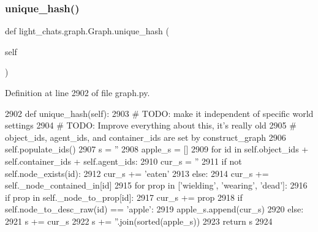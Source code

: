 \subsubsection{\texorpdfstring{unique\+\_\+hash()}{unique\_hash()}}
{\footnotesize\ttfamily def light\+\_\+chats.\+graph.\+Graph.\+unique\+\_\+hash (\begin{DoxyParamCaption}\item[{}]{self }\end{DoxyParamCaption})}



Definition at line 2902 of file graph.\+py.


\begin{DoxyCode}
2902     \textcolor{keyword}{def }unique\_hash(self):
2903         \textcolor{comment}{# TODO: make it independent of specific world settings}
2904         \textcolor{comment}{# TODO: Improve everything about this, it's really old}
2905         \textcolor{comment}{# object\_ids, agent\_ids, and container\_ids are set by construct\_graph}
2906         self.populate\_ids()
2907         s = \textcolor{stringliteral}{''}
2908         apple\_s = []
2909         \textcolor{keywordflow}{for} id \textcolor{keywordflow}{in} self.object\_ids + self.container\_ids + self.agent\_ids:
2910             cur\_s = \textcolor{stringliteral}{''}
2911             \textcolor{keywordflow}{if} \textcolor{keywordflow}{not} self.node\_exists(id):
2912                 cur\_s += \textcolor{stringliteral}{'eaten'}
2913             \textcolor{keywordflow}{else}:
2914                 cur\_s += self.\_node\_contained\_in[id]
2915                 \textcolor{keywordflow}{for} prop \textcolor{keywordflow}{in} [\textcolor{stringliteral}{'wielding'}, \textcolor{stringliteral}{'wearing'}, \textcolor{stringliteral}{'dead'}]:
2916                     \textcolor{keywordflow}{if} prop \textcolor{keywordflow}{in} self.\_node\_to\_prop[id]:
2917                         cur\_s += prop
2918             \textcolor{keywordflow}{if} self.node\_to\_desc\_raw(id) == \textcolor{stringliteral}{'apple'}:
2919                 apple\_s.append(cur\_s)
2920             \textcolor{keywordflow}{else}:
2921                 s += cur\_s
2922         s += \textcolor{stringliteral}{''}.join(sorted(apple\_s))
2923         \textcolor{keywordflow}{return} s
2924 
\end{DoxyCode}
\mbox{\label{classlight__chats_1_1graph_1_1Graph_a7a4820f5a9eff4261a81df8537937ac1}} 
